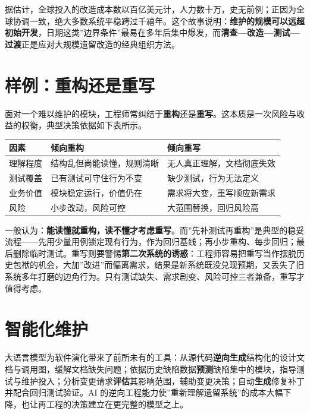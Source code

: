 \documentclass[
]{ctexbook}
\newcounter{none}
\begin{document}
据估计，全球投入的改造成本数以百亿美元计，人力数十万，史无前例；正因为全球协调一致，绝大多数系统平稳跨过千禧年。这个故事说明：\textbf{维护的规模可以远超初始开发}，日期这类''边界条件''最易在多年后集中爆发，而\textbf{清查---改造---测试---过渡}正是应对大规模遗留改造的经典组织方法。

\section{样例：重构还是重写}\label{ux6837ux4f8bux91cdux6784ux8fd8ux662fux91cdux5199}

面对一个难以维护的模块，工程师常纠结于\textbf{重构}还是\textbf{重写}。这本质是一次风险与收益的权衡，典型决策依据如下表所示。

{\def\LTcaptype{none} %
\begin{longtable}[]{@{}lll@{}}
\toprule\noalign{}
因素 & 倾向重构 & 倾向重写 \\
\midrule\noalign{}
\endhead
\bottomrule\noalign{}
\endlastfoot
理解程度 & 结构乱但尚能读懂，规则清晰 & 无人真正理解，文档彻底失效 \\
测试覆盖 & 已有测试可守住行为不变 & 缺少测试，行为无法定义 \\
业务价值 & 模块稳定运行，价值仍在 & 需求将大变，重写顺应新需求 \\
风险 & 小步改动，风险可控 & 大范围替换，回归风险高 \\
\end{longtable}
}

一般认为：\textbf{能读懂就重构，读不懂才考虑重写}。而''先补测试再重构''是典型的稳妥流程------先用少量用例锁定现有行为，作为回归基线；再小步重构、每步回归；最后删除临时测试。重写则要警惕\textbf{第二次系统的诱惑}：工程师容易把重写当作摆脱历史包袱的机会，大加''改进''而偏离需求，结果是新系统既没兑现预期，又丢失了旧系统多年打磨的边角行为。只有测试缺失、需求剧变、风险可控三者兼备，重写才值得考虑。

\section{智能化维护}\label{ux667aux80fdux5316ux7ef4ux62a4}

大语言模型为软件演化带来了前所未有的工具：从源代码\textbf{逆向生成}结构化的设计文档与调用图，缓解文档缺失问题；依据历史缺陷数据\textbf{预测}缺陷集中的模块，指导测试与维护投入；分析变更请求\textbf{评估}其影响范围，辅助变更决策；自动\textbf{生成}修复补丁并配合回归测试验证。AI
的逆向工程能力使''重新理解遗留系统''的成本大幅下降，也让再工程的决策建立在更完整的模型之上。
\end{document}
